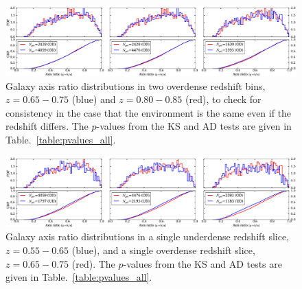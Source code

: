 \documentclass[twocolumn,useAMS,usenatbib]{mn2e}
\begin{document}
\begin{figure}
 \centering
 \includegraphics[width=2.2\columnwidth]{axis_ratio_odod}
 \caption{Galaxy axis ratio
   distributions in two overdense redshift bins, $z=0.65-0.75$ (blue) and
   $z=0.80-0.85$ (red), to check for consistency in the case that the
   environment is the same even if the redshift differs. The
   $p$-values from the KS and AD tests are given in
   Table.~\ref{table:pvalues_all}.}
 \label{fig:axisratio_similar}
\end{figure}

\begin{figure}
 \centering
 \includegraphics[width=2.2\columnwidth]{axis_ratio_odud}
 \caption{Galaxy axis ratio distributions in a single underdense redshift
   slice, $z=0.55-0.65$ (blue), and a single overdense redshift slice,
   $z=0.65-0.75$ (red). The $p$-values from the
   KS and AD tests are given in Table.~\ref{table:pvalues_all}. }
 \label{fig:axisratio_contrasting}
\end{figure}
\end{document}
